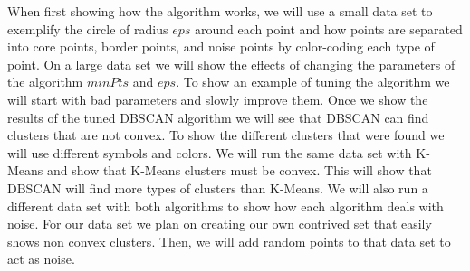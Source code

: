\documentclass{article}
\begin{document}
When first showing how the algorithm works, we will use a small data set to exemplify the circle of radius $eps$ around each point and how points are separated into core points, border points, and noise points by color-coding each type of point. On a large data set we will show the effects of changing the parameters of the algorithm $minPts$ and $eps$. To show an example of tuning the algorithm we will start with bad parameters and slowly improve them. Once we show the results of the tuned DBSCAN algorithm we will see that DBSCAN can find clusters that are not convex. To show the different clusters that were found we will use different symbols and colors. We will run the same data set with K-Means and show that K-Means clusters must be convex. This will show that DBSCAN will find more types of clusters than K-Means. We will also run a different data set with both algorithms to show how each algorithm deals with noise. For our data set we plan on creating our own contrived set that easily shows non convex clusters. Then, we will add random points to that data set to act as noise. 

\newpage


\end{document}

